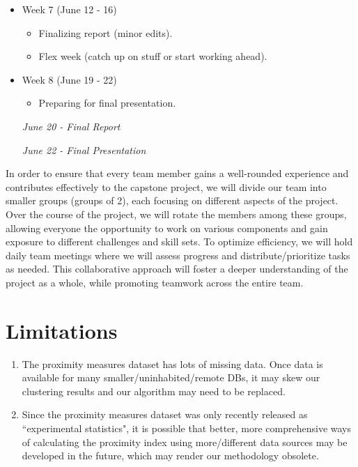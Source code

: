 \documentclass[11pt, a4paper]{article}
\begin{document}
\begin{itemize}
\item Week 7  \dotfill (June 12 - 16)
\begin{itemize}
\item Finalizing report (minor edits). 
\item Flex week (catch up on stuff or start working ahead). 
\end{itemize}

\item Week 8  \dotfill (June 19 - 22)
\begin{itemize} 
\item Preparing for final presentation. 
\end{itemize}

\textit{June 20 - Final Report}
\par
\textit{June 22 - Final Presentation}

\end{itemize}

\vspace{0.5pc}

In order to ensure that every team member gains a well-rounded experience and contributes effectively to the capstone project, we will divide our team into smaller groups (groups of 2), each focusing on different aspects of the project. Over the course of the project, we will rotate the members among these groups, allowing everyone the opportunity to work on various components and gain exposure to different challenges and skill sets. To optimize efficiency, we will hold daily team meetings where we will assess progress and distribute/prioritize tasks as needed. This collaborative approach will foster a deeper understanding of the project as a whole, while promoting teamwork across the entire team. 




\section*{Limitations}

\begin{enumerate}
\item The proximity measures dataset has lots of missing data. Once data is available for many smaller/uninhabited/remote DBs, it may skew our clustering results and our algorithm may need to be replaced. 
\item Since the proximity measures dataset was only recently released as ``experimental statistics", it is possible that better, more comprehensive ways of calculating the proximity index using more/different data sources may be developed in the future, which may render our methodology obsolete. 
\end{enumerate}
\end{document}
